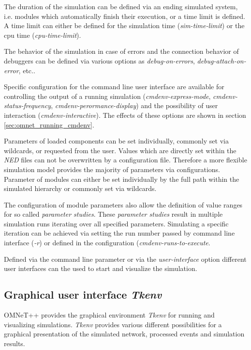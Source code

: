 The duration of the simulation can be defined via an ending simulated system, i.e. modules which automatically finish their execution, or a time limit is defined.
A time limit can either be defined for the simulation time (\emph{sim-time-limit}) or the cpu time (\emph{cpu-time-limit}).

The behavior of the simulation in case of errors and the connection behavior of debuggers can be defined via various options as \emph{debug-on-errors}, \emph{debug-attach-on-error}, etc.. \cite[section 10.1.3]{omnet_manual}

Specific configuration for the command line user interface are available for controlling the output of a running simulation (\emph{cmdenv-express-mode}, \emph{cmdenv-status-frequency}, \emph{cmdenv-perormance-display}) and the possibility of user interaction (\emph{cmdenv-interactive}).
The effects of these options are shown in section \ref{sec:omnet_running_cmdenv}.

Parameters of loaded components can be set individually, commonly set via wildcards, or requested from the user.
Values which are directly set within the \emph{NED} files can not be overwritten by a configuration file.
Therefore a more flexible simulation model provides the majority of parameters via configurations.
Parameter of modules can either be set individually by the full path within the simulated hierarchy or commonly set via wildcards. \cite[section 9.3]{omnet_manual}

The configuration of module parameters also allow the definition of value ranges for so called \emph{parameter studies}.
These \emph{parameter studies} result in multiple simulation runs iterating over all specified parameters.
Simulating a specific iteration can be achieved via setting the run number passed by command line interface (\emph{-r}) or defined in the configuration (\emph{cmdenv-runs-to-execute}. \cite[section 9.4]{omnet_manual}

Defined via the command line parameter or via the \emph{user-interface} option different user interfaces can the used to start and visualize the simulation.

\subsection{Graphical user interface \emph{Tkenv}}
\label{sec:omnet_running_tkenv}
OMNeT++ provides the graphical environment \emph{Tkenv} for running and visualizing simulations.
\emph{Tkenv} provides various different possibilities for a graphical presentation of the simulated network, processed events and simulation results.

